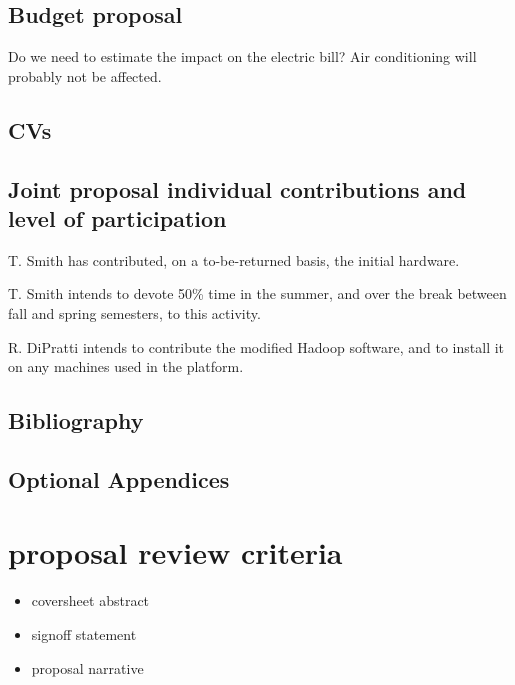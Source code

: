 \documentclass[]{article}
\begin{document}
 \subsection{Budget proposal}
 
 Do we need to estimate the impact on the electric bill? Air conditioning will probably not be affected.
 
 \subsection{CVs}
 \subsection{Joint proposal individual contributions and level of participation}
 
 T. Smith has contributed, on a to-be-returned basis, the initial hardware.
 
 T. Smith intends to devote 50\% time in the summer, and over the break between fall and spring semesters, to this activity.
 
 R. DiPratti intends to contribute the modified Hadoop software, and to install it on any machines used in the platform.
 
 \subsection{Bibliography} %
 
 
 \subsection{Optional Appendices} %
 
 

\section{proposal review criteria}
\begin{itemize}
	\item coversheet abstract
	\item signoff statement %
	\item proposal narrative
\end{itemize}

\end{document}
